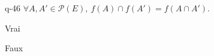 \begin{truefalse}{q-46}
$\forall A,A'\in\mathcal{P}(E),\ f(A)\cap f(A')=f(A\cap A')$.
\item Vrai
\item* Faux
\end{truefalse}

